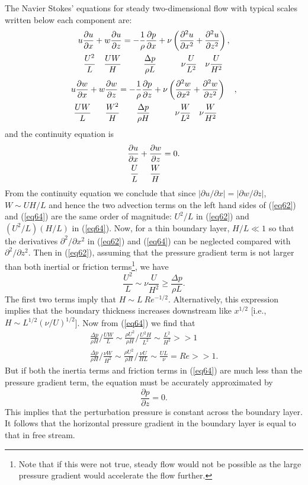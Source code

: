 \documentclass[10pt]{report}
\begin{document}
The Navier Stokes' equations for steady two-dimensional flow with typical
scales written below each component are:
\begin{align}
& u\frac{\partial u}{\partial x}+w\frac{\partial u}{\partial
z}=-\frac{1}{\rho }\frac{\partial p}{\partial x}+\nu
\left( {\frac{\partial ^2u}{\partial x^2}+\frac{\partial
^2u}{\partial z^2}} \right), \label{eq62} \\
& \ \  \frac{U^2}{L}
\quad
\frac{UW}{H}
\ \ \qquad
\frac{\Delta p}{\rho L}
\quad \qquad
\nu \frac{U}{L^2}
\quad
\nu \frac{U}{H^2} \notag
\end{align}
\begin{align}
& u\frac{\partial w}{\partial x}+w\frac{\partial w}{\partial
z}=-\frac{1}{\rho }\frac{\partial p}{\partial z}+\nu
\left( {\frac{\partial ^2w}{\partial x^2}+\frac{\partial
^2w}{\partial z^2}} \right)\quad , \label{eq64} \\
&\  \frac{UW}{L}
\ \ \quad
\frac{W^2}{H}
\qquad
\frac{\Delta p}{\rho H}
\qquad \quad
\nu \frac{W}{L^2}
\quad
\nu \frac{W}{H^2} \notag
\end{align}
and the continuity equation is
\begin{align}
& \frac{\partial u}{\partial x}+\frac{\partial w}{\partial
z}=0. \label{eq66} \\
& \ \frac{U}{L}
\ \quad
\frac{W}{H} \notag
\end{align}
From the continuity equation we conclude that since $\left| {{\partial u}
/ {\partial x}} \right|=\left| {{\partial w}
/ {\partial z}} \right|$, $W \sim UH/L$ and hence
the two advection terms on the left hand sides of (\ref{eq62}) and (\ref{eq64}) are the
same order of magnitude: $U^{2}/L$ in (\ref{eq62}) and $(U^{2}/L) (H/L)$ in
(\ref{eq64}). Now, for a thin boundary layer, $H/L \ll 1$ so that the derivatives
$\partial ^{2}/\partial x^{2 }$ in (\ref{eq62}) and (\ref{eq64}) can be neglected
compared with $\partial ^{2}/\partial z^{2 }$. Then in (\ref{eq62}), assuming
that the pressure gradient term is not larger than both inertial or friction
terms\footnote{ Note that if this were not true, steady flow would not be
possible as the large pressure gradient would accelerate the flow further.},
we have
\[
\frac{U^2}{L}\sim \nu \frac{U}{H^2}\ge \frac{\Delta p}{\rho L}.
\]
The first two terms imply that $H \sim L\ Re^{-1/2}$. Alternatively, this
expression implies that the boundary thickness increases downstream like
$x^{1/2}$ [i.e., $H \sim L^{1/2} (\nu /U)^{1/2}$]. Now from (\ref{eq64}) we
find that
\begin{gather*}
{\frac{\Delta p}{\rho H}} / {\frac{UW}{L}}\sim
{\frac{\rho U^2}{\rho H}} /
{\frac{U^2H}{L^2}}\sim \frac{L^2}{H^2}>>1 \\
{\frac{\Delta p}{\rho H}} / {\frac{\nu
W}{H^2}}\sim {\frac{\rho U^2}{\rho H}} /{\frac{\nu U}{HL}}\sim \frac{UL}{\nu }=Re>>1.
\end{gather*}
But if both the inertia terms and friction terms in (\ref{eq64}) are much less than
the pressure gradient term, the equation must be accurately approximated by
\[
\frac{\partial p}{\partial z}=0.
\]
This implies that the perturbation pressure is constant across the boundary
layer. It follows that the horizontal pressure gradient in the boundary
layer is equal to that in free stream.
\end{document}
